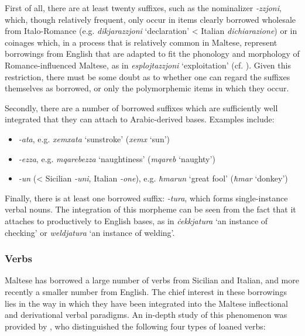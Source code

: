 \documentclass[output=paper]{langsci/langscibook}
\begin{document}
First of all, there are at least twenty suffixes, such as the nominalizer \textit{-zzjoni}, which, though relatively frequent, only occur in items clearly borrowed wholesale from Italo-Romance (e.g. \textit{dikjarazzjoni} `declaration' < Italian \textit{dichiarazione}) or in coinages which, in a process that is relatively common in Maltese, represent borrowings from English that are adapted to fit the phonology and morphology of Romance-influenced Maltese, as in \textit{esplojtazzjoni} `exploitation' (cf. \citealt{gattfabri2018}). Given this restriction, there must be some doubt as to whether one can regard the suffixes themselves as borrowed, or only the polymorphemic items in which they occur.

Secondly, there are a number of borrowed suffixes which are sufficiently well integrated that they can attach to Arabic-derived bases. Examples include:

\begin{itemize}[noitemsep]
	\item[] \textit{-ata}, e.g. \textit{xemxata} `sunstroke' (\textit{xemx} `sun')
    \item[] \textit{-ezza}, e.g. \textit{mqarebezza} `naughtiness' (\textit{mqareb} `naughty') 
    \item[] \textit{-un} (< Sicilian \textit{-uni}, Italian \textit{-one}), e.g. \textit{ħmarun} `great fool' (\textit{ħmar} `donkey')
\end{itemize}

Finally, there is at least one borrowed suffix: \textit{-tura}, which forms single-instance verbal nouns. The integration of this morpheme can be seen from the fact that it attaches to productively to English bases, as in \textit{ċekkjatura} `an instance of checking' or \textit{weldjatura} `an instance of welding'.

\subsubsection{Verbs}\label{verbmorphology}
\label{loanedverbs} 
Maltese has borrowed a large number of verbs from Sicilian and Italian, and more recently a smaller number from English. The chief interest in these borrowings lies in the way in which they have been integrated into the Maltese inflectional and derivational verbal paradigms. An in-depth study of this phenomenon was provided by \cite{mifsudloanverbs}, who distinguished the following four types of loaned verbs:
\end{document}
